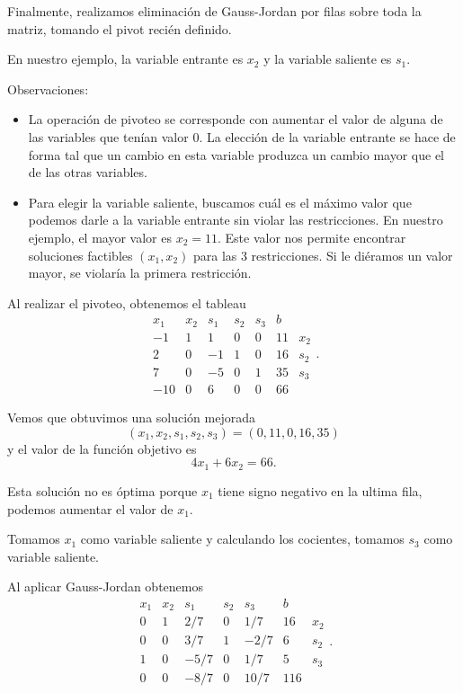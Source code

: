 Finalmente, realizamos eliminación de Gauss-Jordan por filas sobre toda la matriz, tomando el pivot recién definido.

En nuestro ejemplo, la variable entrante es $x_2$ y la variable saliente es $s_1$.

Observaciones:
\begin{itemize}
\item La operación de pivoteo se corresponde con aumentar el valor de alguna de las variables que tenían valor 0. La elección de la variable entrante se hace de forma tal que un cambio en esta variable produzca un cambio mayor que el de las otras variables.
\item Para elegir la variable saliente, buscamos cuál es el máximo valor que podemos darle a la variable entrante sin violar las restricciones. En nuestro ejemplo, el mayor valor es $x_2 = 11$. Este valor nos permite encontrar soluciones factibles $(x_1, x_2)$ para las 3 restricciones. Si le diéramos un valor mayor, se violaría la primera restricción.
\end{itemize}

Al realizar el pivoteo, obtenemos el tableau
$$
\begin{array}{ccccccc}
x_1 & x_2 & s_1 & s_2 & s_3 & b & \\ \hline
-1 & 1 & 1 & 0 & 0 & 11 & x_2 \\
2 & 0 & -1 & 1 & 0 & 16 & s_2 \\
7 & 0 & -5 & 0 & 1 & 35 & s_3 \\ \hline
-10 & 0 & 6 & 0 & 0 & 66 &
\end{array}.
$$

Vemos que obtuvimos una solución mejorada
$$
(x_1, x_2, s_1, s_2, s_3) = (0, 11, 0, 16, 35)
$$
y el valor de la función objetivo es
$$
4 x_1 + 6 x_2 = 66.
$$

Esta solución no es óptima porque $x_1$ tiene signo negativo en la ultima fila, podemos aumentar el valor de $x_1$.

Tomamos $x_1$ como variable saliente y calculando los cocientes, tomamos $s_3$ como variable saliente.

Al aplicar Gauss-Jordan obtenemos
$$
\begin{array}{ccccccc}
x_1 & x_2 & s_1 & s_2 & s_3 & b & \\ \hline
0 & 1 & 2/7 & 0 & 1/7 & 16 & x_2 \\
0 & 0 & 3/7 & 1 & -2/7 & 6 & s_2 \\
1 & 0 & -5/7 & 0 & 1/7 & 5 & s_3 \\ \hline
0 & 0 & -8/7 & 0 & 10/7 & 116 &
\end{array}.
$$

